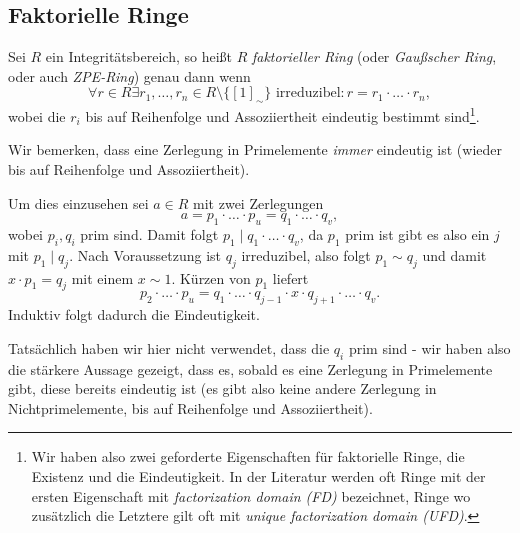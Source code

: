 
\subsection{Faktorielle Ringe}

\begin{definition}
    Sei $R$ ein Integritätsbereich, so heißt $R$ \emph{faktorieller Ring} (oder \emph{Gaußscher Ring}, oder auch \emph{ZPE-Ring}) genau dann wenn
    $$ \forall r \in R \exists r_1, \hdots, r_n \in R \setminus \{ [1]_\sim \} \text{ irreduzibel} : r = r_1 \cdot \hdots \cdot r_n, $$
    wobei die $r_i$ bis auf Reihenfolge und Assoziiertheit eindeutig bestimmt sind\footnote{Wir haben also zwei geforderte Eigenschaften für faktorielle Ringe, die Existenz und die Eindeutigkeit. In der Literatur werden oft Ringe mit der ersten Eigenschaft mit \emph{factorization domain (FD)} bezeichnet, Ringe wo zusätzlich die Letztere gilt oft mit \emph{unique factorization domain (UFD)}.}.
\end{definition}

\begin{remark}
    Wir bemerken, dass eine Zerlegung in Primelemente \emph{immer} eindeutig ist (wieder bis auf Reihenfolge und Assoziiertheit).

    Um dies einzusehen sei $a \in R$ mit zwei Zerlegungen
    $$ a = p_1 \cdot \hdots \cdot p_u = q_1 \cdot \hdots \cdot q_v, $$
    wobei $p_i, q_i$ prim sind. Damit folgt $p_1 \mid q_1 \cdot \hdots \cdot q_v$, da $p_1$ prim ist gibt es also ein $j$ mit $p_1 \mid q_j$. Nach Voraussetzung ist $q_j$ irreduzibel, also folgt $p_1 \sim q_j$ und damit $x \cdot p_1 = q_j$ mit einem $x \sim 1$. Kürzen von $p_1$ liefert
    $$ p_2 \cdot \hdots \cdot p_u = q_1 \cdot \hdots \cdot q_{j-1} \cdot x \cdot q_{j+1} \cdot \hdots \cdot q_v. $$
    Induktiv folgt dadurch die Eindeutigkeit.

    Tatsächlich haben wir hier nicht verwendet, dass die $q_i$ prim sind - wir haben also die stärkere Aussage gezeigt, dass es, sobald es eine Zerlegung in Primelemente gibt, diese bereits eindeutig ist (es gibt also keine andere Zerlegung in Nichtprimelemente, bis auf Reihenfolge und Assoziiertheit).
\end{remark}

